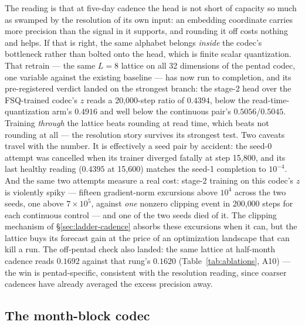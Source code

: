 \documentclass[10pt]{article}
\begin{document}
The reading is that at five-day cadence the head is not short of capacity so
much as swamped by the resolution of its own input: an embedding coordinate
carries more precision than the signal in it supports, and rounding it off
costs nothing and helps. If that is right, the same alphabet belongs
\emph{inside} the codec's bottleneck rather than bolted onto the head, which
is finite scalar quantization. That retrain --- the same $L=8$ lattice on
all 32 dimensions of the pentad codec, one variable against the existing
baseline --- has now run to completion, and its pre-registered verdict
landed on the strongest branch: the stage-2 head over the FSQ-trained
codec's $z$ reads a 20{,}000-step ratio of $\mathbf{0.4394}$, below the
read-time-quantization arm's $0.4916$ and well below the continuous pair's
$0.5056$/$0.5045$. Training \emph{through} the lattice beats rounding at
read time, which beats not rounding at all --- the resolution story survives
its strongest test. Two caveats travel with the number. It is effectively a
seed pair by accident: the seed-0 attempt was cancelled when its trainer
diverged fatally at step 15{,}800, and its last healthy reading ($0.4395$ at
15{,}600) matches the seed-1 completion to $10^{-4}$. And the same two
attempts measure a real cost: stage-2 training on this codec's $z$ is
violently spiky --- fifteen gradient-norm excursions above $10^4$ across the
two seeds, one above $7\times10^5$, against \emph{one} nonzero clipping
event in 200{,}000 steps for each continuous control --- and one of the two
seeds died of it. The clipping mechanism of \S\ref{sec:ladder-cadence}
absorbs these excursions when it can, but the lattice buys its forecast
gain at the price of an optimization landscape that can kill a run. The
off-pentad check also landed: the same lattice at half-month cadence reads
$0.1692$ against that rung's $0.1620$ (Table~\ref{tab:ablations}, A10) ---
the win is pentad-specific, consistent with the resolution reading, since
coarser cadences have already averaged the excess precision away.

\subsection{The month-block codec}\label{sec:block}
\end{document}
